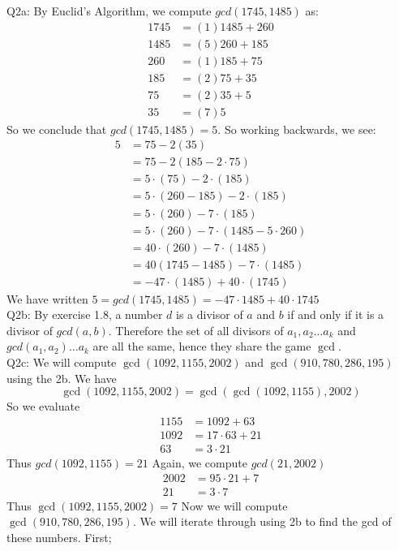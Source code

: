 \documentclass[letterpaper]{article}
\begin{document}
\noindent
Q2a: By Euclid's Algorithm, we compute $gcd(1745,1485)$ as: 
\begin{align*}
    1745 & = (1)1485 + 260
    \\ 1485 & = (5)260+185
    \\ 260 &= (1)185+75
    \\ 185 &= (2)75+35
    \\ 75 &= (2)35+5
    \\ 35 &= (7)5 
\end{align*} So we conclude that $gcd(1745,1485)=5$. So working backwards, we see: 
\begin{align*}
    5 & = 75-2(35)
    \\ & = 75-2(185-2\cdot 75)
    \\ & = 5\cdot (75) -2\cdot(185)
    \\ & = 5\cdot(260-185)-2\cdot(185)
    \\ & = 5\cdot(260) -7\cdot(185)
    \\ & = 5\cdot(260)-7\cdot(1485-5 \cdot 260)
    \\ & = 40\cdot(260)-7\cdot (1485)
    \\ & = 40(1745-1485)-7 \cdot(1485)
    \\ & = -47\cdot(1485) + 40 \cdot (1745)
\end{align*} We have written $5=gcd(1745,1485) = -47\cdot 1485 + 40 \cdot 1745$
\newline \\ Q2b: By exercise 1.8, a number $d$ is a divisor of $a$ and $b$ if and only if it is a divisor of $gcd(a,b)$. Therefore the set of all divisors of $a_1,a_2\dots a_k$ and $gcd(a_1,a_2)\dots a_k$ are all the same, hence they share the game $\gcd$.
\newline \\ Q2c: We will compute $\gcd(1092,1155,2002)$ and $\gcd(910,780,286,195)$ using the 2b. We have $$\gcd(1092,1155,2002) = \gcd(\gcd(1092,1155),2002)$$ 
So we evaluate 
\begin{align*}
    1155 & = 1092+63
    \\ 1092 &= 17\cdot 63 +21
    \\ 63 & = 3\cdot 21
\end{align*} Thus $gcd(1092,1155) = 21$
Again, we compute $gcd(21,2002)$ 
\begin{align*}
    2002 & = 95\cdot 21  + 7
    \\ 21 & = 3\cdot 7
\end{align*} Thus $\gcd(1092,1155,2002) = 7$
Now we will compute $\gcd(910,780,286,195)$. We will iterate through using 2b to find the gcd of these numbers. First; 
\end{document}
